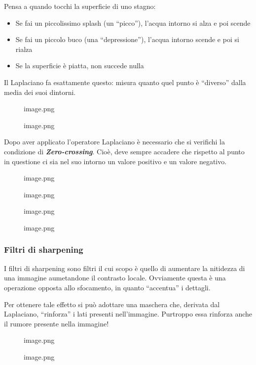\documentclass[
]{article}
\providecommand{\tightlist}{%
  \setlength{\itemsep}{0pt}\setlength{\parskip}{0pt}}
\begin{document}
Pensa a quando tocchi la superficie di uno stagno:

\begin{itemize}
\tightlist
\item
  Se fai un piccolissimo splash (un ``picco''), l'acqua intorno si alza e poi scende
\item
  Se fai un piccolo buco (una ``depressione''), l'acqua intorno scende e poi si rialza
\item
  Se la superficie è piatta, non succede nulla
\end{itemize}

Il Laplaciano fa esattamente questo: misura quanto quel punto è ``diverso'' dalla media dei suoi dintorni.

\begin{figure}
\centering
{image.png}
\caption{image.png}
\end{figure}

Dopo aver applicato l'operatore Laplaciano è necessario che si verifichi la condizione di \textbf{\emph{Zero-crossing}}. Cioè, deve sempre accadere che rispetto al punto in questione ci sia nel suo intorno un valore positivo e un valore negativo.

\begin{figure}
\centering
{image.png}
\caption{image.png}
\end{figure}

\begin{figure}
\centering
{image.png}
\caption{image.png}
\end{figure}

\hypertarget{filtri-di-sharpening}{%
\subsubsection{Filtri di sharpening}\label{filtri-di-sharpening}}

I filtri di sharpening sono filtri il cui scopo è quello di aumentare la nitidezza di una immagine aumetandone il contrasto locale. Ovviamente questa è una operazione opposta allo
sfocamento, in quanto ``accentua'' i dettagli.

Per ottenere tale effetto si può adottare una maschera che, derivata dal Laplaciano, ``rinforza'' i lati presenti nell'immagine. Purtroppo essa rinforza anche il rumore
presente nella immagine!

\begin{figure}
\centering
{image.png}
\caption{image.png}
\end{figure}
\end{document}
